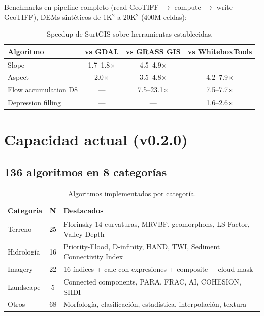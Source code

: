 \documentclass[11pt,a4paper]{article}
\begin{document}
Benchmarks en pipeline completo (read GeoTIFF $\to$ compute $\to$ write GeoTIFF), DEMs sint\'eticos de 1K$^2$ a 20K$^2$ (400M celdas):

\begin{table}[h]
\centering
\small
\begin{tabular}{lccc}
\toprule
\textbf{Algoritmo} & \textbf{vs GDAL} & \textbf{vs GRASS GIS} & \textbf{vs WhiteboxTools} \\
\midrule
Slope & 1.7--1.8$\times$ & 4.5--4.9$\times$ & --- \\
Aspect & 2.0$\times$ & 3.5--4.8$\times$ & 4.2--7.9$\times$ \\
Flow accumulation D8 & --- & 7.5--23.1$\times$ & 7.5--7.7$\times$ \\
Depression filling & --- & --- & 1.6--2.6$\times$ \\
\bottomrule
\end{tabular}
\caption{Speedup de SurtGIS sobre herramientas establecidas.}
\end{table}

\section{Capacidad actual (v0.2.0)}

\subsection{136 algoritmos en 8 categor\'ias}

\begin{table}[h]
\centering
\small
\begin{tabularx}{\textwidth}{lcX}
\toprule
\textbf{Categor\'ia} & \textbf{N} & \textbf{Destacados} \\
\midrule
Terreno & 25 & Florinsky 14 curvaturas, MRVBF, geomorphons, LS-Factor, Valley Depth \\
Hidrolog\'ia & 16 & Priority-Flood, D-infinity, HAND, TWI, Sediment Connectivity Index \\
Imagery & 22 & 16 \'indices + calc con expresiones + composite + cloud-mask \\
Landscape & 5 & Connected components, PARA, FRAC, AI, COHESION, SHDI \\
Otros & 68 & Morfolog\'ia, clasificaci\'on, estad\'istica, interpolaci\'on, textura \\
\bottomrule
\end{tabularx}
\caption{Algoritmos implementados por categor\'ia.}
\end{table}
\end{document}
